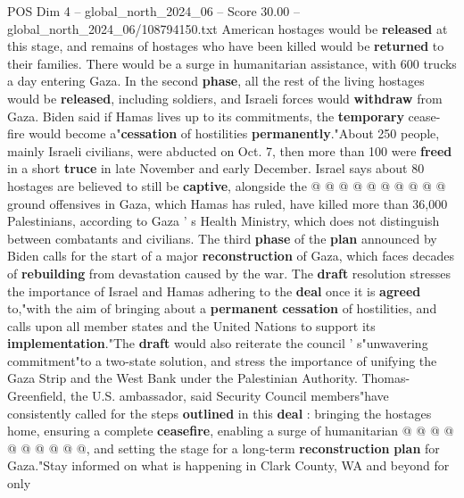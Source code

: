 \begin{textsample}{POS Dim 4 – global\_north\_2024\_06 – Score 30.00 – global\_north\_2024\_06/108794150.txt}
American hostages would be \textbf{released} at this stage, and remains of hostages who have been killed would be \textbf{returned} to their families.
There would be a surge in humanitarian assistance, with 600 trucks a day entering Gaza.
In the second \textbf{phase}, all the rest of the living hostages would be \textbf{released}, including soldiers, and Israeli forces would \textbf{withdraw} from Gaza.
Biden said if Hamas lives up to its commitments, the \textbf{temporary} cease-fire would become a"\textbf{cessation} of hostilities \textbf{permanently}."About 250 people, mainly Israeli civilians, were abducted on Oct. 7, then more than 100 were \textbf{freed} in a short \textbf{truce} in late November and early December.
Israel says about 80 hostages are believed to still be \textbf{captive}, alongside the @ @ @ @ @ @ @ @ @ @ ground offensives in Gaza, which Hamas has ruled, have killed more than 36,000 Palestinians, according to Gaza ' s Health Ministry, which does not distinguish between combatants and civilians.
The third \textbf{phase} of the \textbf{plan} announced by Biden calls for the start of a major \textbf{reconstruction} of Gaza, which faces decades of \textbf{rebuilding} from devastation caused by the war.
The \textbf{draft} resolution stresses the importance of Israel and Hamas adhering to the \textbf{deal} once it is \textbf{agreed} to,"with the aim of bringing about a \textbf{permanent} \textbf{cessation} of hostilities, and calls upon all member states and the United Nations to support its \textbf{implementation}."The \textbf{draft} would also reiterate the council ' s"unwavering commitment"to a two-state solution, and stress the importance of unifying the Gaza Strip and the West Bank under the Palestinian Authority.
Thomas-Greenfield, the U.S. ambassador, said Security Council members"have consistently called for the steps \textbf{outlined} in this \textbf{deal} : bringing the hostages home, ensuring a complete \textbf{ceasefire}, enabling a surge of humanitarian @ @ @ @ @ @ @ @ @ @, and setting the stage for a long-term \textbf{reconstruction} \textbf{plan} for Gaza."Stay informed on what is happening in Clark County, WA and beyond for only

\end{textsample}
